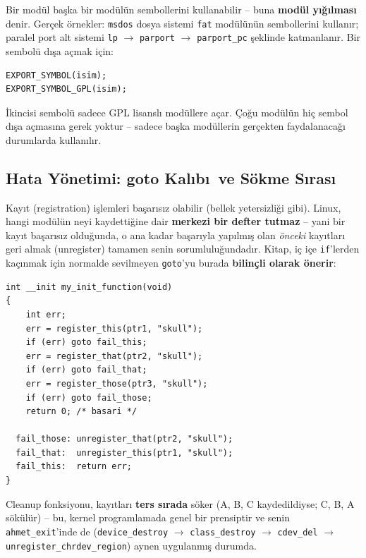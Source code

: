\documentclass[11pt,a4paper]{article}
\begin{document}
Bir modül başka bir modülün sembollerini kullanabilir -- buna
\textbf{modül yığılması} denir. Gerçek örnekler: \texttt{msdos}
dosya sistemi \texttt{fat} modülünün sembollerini kullanır; paralel
port alt sistemi \texttt{lp} $\to$ \texttt{parport} $\to$
\texttt{parport\_pc} şeklinde katmanlanır. Bir sembolü dışa açmak için:

\begin{lstlisting}
EXPORT_SYMBOL(isim);
EXPORT_SYMBOL_GPL(isim);
\end{lstlisting}

İkincisi sembolü sadece GPL lisanslı modüllere açar. Çoğu modülün hiç
sembol dışa açmasına gerek yoktur -- sadece başka modüllerin
gerçekten faydalanacağı durumlarda kullanılır.

\subsection{Hata Y\"onetimi: goto Kal\i b\i\ ve S\"okme S\i ras\i}

Kayıt (registration) işlemleri başarısız olabilir (bellek yetersizliği
gibi). Linux, hangi modülün neyi kaydettiğine dair \textbf{merkezi bir
defter tutmaz} -- yani bir kayıt başarısız olduğunda, o ana kadar
başarıyla yapılmış olan \emph{önceki} kayıtları geri almak (unregister)
tamamen senin sorumluluğundadır. Kitap, iç içe \texttt{if}'lerden
kaçınmak için normalde sevilmeyen \texttt{goto}'yu burada
\textbf{bilinçli olarak önerir}:

\begin{lstlisting}
int __init my_init_function(void)
{
    int err;
    err = register_this(ptr1, "skull");
    if (err) goto fail_this;
    err = register_that(ptr2, "skull");
    if (err) goto fail_that;
    err = register_those(ptr3, "skull");
    if (err) goto fail_those;
    return 0; /* basari */

  fail_those: unregister_that(ptr2, "skull");
  fail_that:  unregister_this(ptr1, "skull");
  fail_this:  return err;
}
\end{lstlisting}

Cleanup fonksiyonu, kayıtları \textbf{ters sırada} söker (A, B, C
kaydedildiyse; C, B, A sökülür) -- bu, kernel programlamada genel bir
prensiptir ve senin \texttt{ahmet\_exit}'inde de
(\texttt{device\_destroy} $\to$ \texttt{class\_destroy} $\to$
\texttt{cdev\_del} $\to$ \texttt{unregister\_chrdev\_region}) aynen
uygulanmış durumda.
\end{document}
